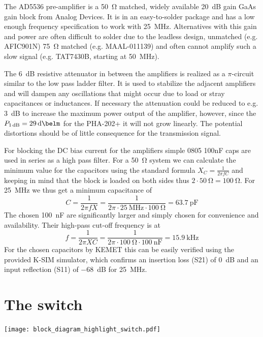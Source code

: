 The AD5536 pre-amplifier is a \qty{50}{\ohm} matched, widely available \qty{20}{\deci\bel} gain GaAs gain block from Analog Devices. It is in an easy-to-solder package and has a low enough frequency specification to work with \qty{25}{\mega\hertz}. Alternatives with this gain and power are often difficult to solder due to the leadless design, unmatched (e.g. AFIC901N) \qty{75}{\ohm} matched (e.g. MAAL-011139) and often cannot amplify such a slow signal (e.g. TAT7430B, starting at \qty{50}{\mega\hertz}).

The \qty{6}{\deci\bel} resistive attenuator in between the amplifiers is realized as a \(\pi\)-circuit similar to the low pass ladder filter. It is used to stabilize the adjacent amplifiers and will dampen any oscillations that might occur due to load or stray capacitances or inductances. If necessary the attenuation could be reduced to e.g. \qty{3}{\deci\bel} to increase the maximum power output of the amplifier, however, since the \(P_{\qty{1}{\deci\bel}} = \qty{29}{\deci\belm}\) for the PHA-202+ it will not grow linearly. The potential distortions should be of little consequence for the transmission signal.

For blocking the DC bias current for the amplifiers simple 0805 100nF caps are used in series as a high pass filter. For a \qty{50}{\ohm} system we can calculate the minimum value for the capacitors using the standard formula \(X_C = \frac{1}{2\pi{}fC}\) and keeping in mind that the block is loaded on both sides thus \( 2 \cdot \qty{50}{\ohm} = \qty{100}{\ohm}\). For \qty{25}{\mega\hertz} we thus get a minimum capacitance of
\[
    C = \frac{1}{2\pi{}fX} = \frac{1}{2\pi{} \cdot{} \qty{25}{\mega\hertz} \cdot{} \qty{100}{\ohm}} = \qty{63.7}{\pico\farad}
\]
The chosen \qty{100}{\nano\farad} are significantly larger and simply chosen for convenience and availability. Their high-pass cut-off frequency is at
\[
    f = \frac{1}{2\pi{}XC} = \frac{1}{2\pi{} \cdot{} \qty{100}{\ohm} \cdot{} \qty{100}{\nano\farad}} = \qty{15.9}{\kilo\hertz}
\]
For the chosen capacitors by KEMET this can be easily verified using the provided K-SIM simulator, which confirms an insertion loss (S21) of \qty{0}{\deci\bel} and an input reflection (S11) of \qty{-68}{\deci\bel} for \qty{25}{\mega\hertz}.


\section{The switch}
\begin{marginfigure}
    \texttt{[image: block\_diagram\_highlight\_switch.pdf]}
\end{marginfigure}

